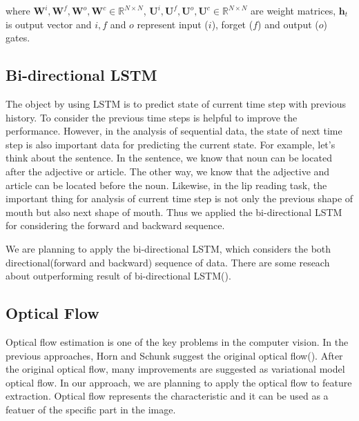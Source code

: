 where $\mathbf{W}^i, \mathbf{W}^f, \mathbf{W}^o, \mathbf{W}^c \in \mathbb{R}^{N \times N}$, $\mathbf{U}^i, \mathbf{U}^f, \mathbf{U}^o, \mathbf{U}^c \in \mathbb{R}^{N \times N}$ are weight matrices, $\mathbf h_t$ is output vector and $i, f$ and $o$ represent input ($i$), forget ($f$) and output ($o$) gates.

\subsection{Bi-directional LSTM}

The object by using LSTM is to predict state of current time step with previous history. To consider the previous time steps is helpful to improve the performance. However, in the analysis of sequential data, the state of next time step is also important data for predicting the current state. For example, let’s think about the sentence. In the sentence, we know that noun can be located after the adjective or article. The other way, we know that the adjective and article can be located before the noun. Likewise, in the lip reading task, the important thing for analysis of current time step is not only the previous shape of mouth but also next shape of mouth. Thus we applied the bi-directional LSTM for considering the forward and backward sequence. 

We are planning to apply the bi-directional LSTM, which considers the both directional(forward and backward) sequence of data. There are some reseach about outperforming result of bi-directional LSTM(\cite{BiLSTM}). 



\subsection{Optical Flow}

Optical flow estimation is one of the key problems in the computer vision. In the previous approaches, Horn and Schunk suggest the original optical flow(\cite{Horn1993}). After the original optical flow, many improvements are suggested as variational model optical flow. In our approach, we are planning to apply the optical flow to feature extraction. Optical flow represents the characteristic and it can be used as a featuer of the specific part in the image.


